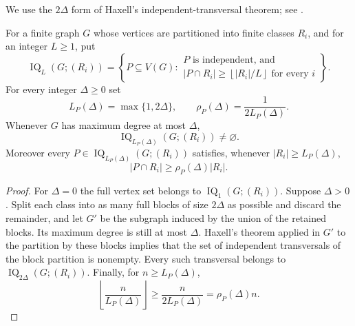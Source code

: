 We use the $2\Delta$ form of Haxell's independent-transversal theorem; see \cite[Theorem~2]{Haxell2001}.

\begin{proposition}\label{prop:haxell-quota}
For a finite graph $G$ whose vertices are partitioned into finite classes $R_i$, and for an integer $L\ge1$, put
\[
\operatorname{IQ}_L(G;(R_i))=
\left\{
P\subseteq V(G):
\begin{array}{l}
P\text{ is independent, and}\\[-1mm]
|P\cap R_i|\ge\left\lfloor |R_i|/L\right\rfloor\text{ for every }i
\end{array}
\right\}.
\]
For every integer $\Delta\ge0$ set
\begin{equation}\label{eq:haxell-canonical-parameters}
L_P(\Delta)=\max\{1,2\Delta\},
\qquad
\rho_P(\Delta)=\frac1{2L_P(\Delta)}.
\end{equation}
Whenever $G$ has maximum degree at most $\Delta$,
\begin{equation}\label{eq:independent-quota-nonempty}
\operatorname{IQ}_{L_P(\Delta)}(G;(R_i))\ne\varnothing.
\end{equation}
Moreover every $P\in\operatorname{IQ}_{L_P(\Delta)}(G;(R_i))$ satisfies, whenever $|R_i|\ge L_P(\Delta)$,
\[
|P\cap R_i|\ge \rho_P(\Delta)|R_i|.
\]
\end{proposition}

\begin{proof}
For $\Delta=0$ the full vertex set belongs to $\operatorname{IQ}_1(G;(R_i))$.  Suppose $\Delta>0$.  Split each class into as many full blocks of size $2\Delta$ as possible and discard the remainder, and let $G'$ be the subgraph induced by the union of the retained blocks.  Its maximum degree is still at most $\Delta$.  Haxell's theorem applied in $G'$ to the partition by these blocks implies that the set of independent transversals of the block partition is nonempty.  Every such transversal belongs to $\operatorname{IQ}_{2\Delta}(G;(R_i))$.  Finally, for $n\ge L_P(\Delta)$,
\[
\left\lfloor\frac n{L_P(\Delta)}\right\rfloor
\ge\frac{n}{2L_P(\Delta)}
=\rho_P(\Delta)n.
\]
\end{proof}
